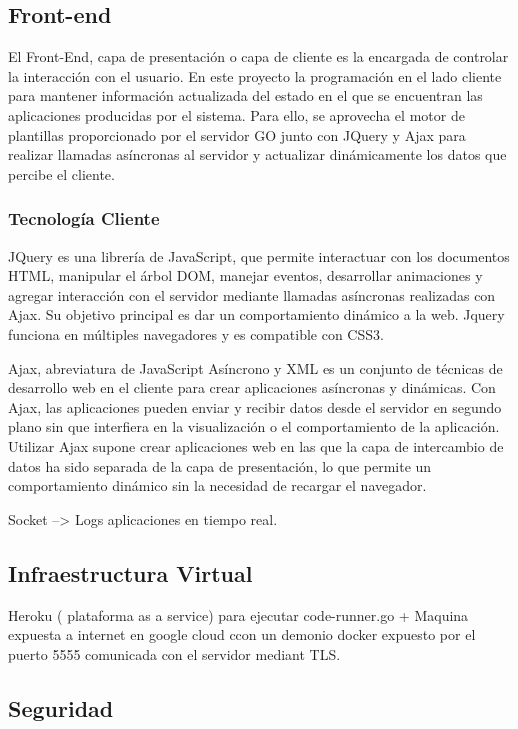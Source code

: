 \documentclass[a4paper,11pt]{book}
\begin{document}
\subsection{Front-end}

El Front-End, capa de presentación o capa de cliente es la encargada de controlar la interacción con el usuario. En este proyecto la programación en el lado cliente para mantener  información actualizada del estado en el que se encuentran las aplicaciones producidas por el sistema. Para ello, se aprovecha el motor de plantillas proporcionado por el servidor GO junto con JQuery y Ajax para realizar llamadas asíncronas al servidor y actualizar dinámicamente los datos que percibe el cliente.

\subsubsection{Tecnología Cliente}


JQuery\cite{jq} es una librería de JavaScript, que permite interactuar con los documentos HTML, manipular el árbol DOM, manejar eventos, desarrollar animaciones y agregar interacción con el servidor mediante llamadas asíncronas realizadas con Ajax. Su objetivo principal es dar un comportamiento dinámico a la web. Jquery funciona en múltiples navegadores y es compatible con CSS3.

Ajax\cite{aj}, abreviatura de JavaScript Asíncrono y XML es un conjunto de técnicas de desarrollo web en el cliente para crear aplicaciones asíncronas y dinámicas. Con Ajax, las aplicaciones pueden enviar y recibir datos desde el servidor en segundo plano sin que interfiera en la visualización o el comportamiento de la aplicación. Utilizar Ajax supone crear aplicaciones web en las que la capa de intercambio de datos ha sido separada de la capa de presentación, lo que permite un comportamiento dinámico sin la necesidad de recargar el navegador.


Socket  --> Logs aplicaciones en tiempo real.

\subsection{Infraestructura Virtual}
Heroku ( plataforma as a service) para ejecutar code-runner.go + Maquina expuesta a internet en google cloud ccon un demonio docker expuesto por el puerto 5555 comunicada con el servidor mediant TLS.

\subsection{Seguridad}
\end{document}
